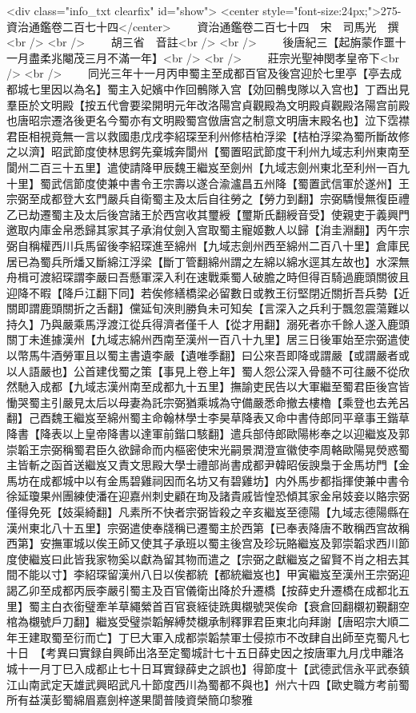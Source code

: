 <div class="info_txt clearfix" id="show">
<center style="font-size:24px;">275-資治通鑑卷二百七十四</center>
  　　資治通鑑卷二百七十四　宋　司馬光　撰<br />
<br />
　　胡三省　音註<br />
<br />
　　後唐紀三【起旃蒙作噩十一月盡柔兆閹茂三月不滿一年】<br />
<br />
　　莊宗光聖神閔孝皇帝下<br />
<br />
　　同光三年十一月丙申蜀主至成都百官及後宫迎於七里亭【亭去成都城七里因以為名】蜀主入妃嬪中作回鶻隊入宫【効回鶻曳隊以入宫也】丁酉出見羣臣於文明殿【按五代會要梁開明元年改洛陽宫貞觀殿為文明殿貞觀殿洛陽宫前殿也唐昭宗遷洛後更名今蜀亦有文明殿蜀宫倣唐宫之制意文明唐末殿名也】泣下霑襟君臣相視竟無一言以救國患戊戌李紹琛至利州修桔柏浮梁【桔柏浮梁為蜀所斷故修之以濟】昭武節度使林思鍔先棄城奔閬州【蜀置昭武節度干利州九域志利州東南至閬州二百三十五里】遣使請降甲辰魏王繼岌至劍州【九域志劍州東北至利州一百九十里】蜀武信節度使兼中書令王宗壽以遂合渝瀘昌五州降【蜀置武信軍於遂州】王宗弼至成都登大玄門嚴兵自衛蜀主及太后自往勞之【勞力到翻】宗弼驕慢無復臣禮乙已劫遷蜀主及太后後宫諸王於西宫收其璽綬【璽斯氏翻綬音受】使親吏于義興門邀取内庫金帛悉歸其家其子承㳙仗劍入宫取蜀主寵姬數人以歸【㳙圭淵翻】丙午宗弼自稱權西川兵馬留後李紹琛進至綿州【九域志劍州西至綿州二百八十里】倉庫民居已為蜀兵所燔又斷綿江浮梁【斷丁管翻綿州謂之左綿以綿水逕其左故也】水深無舟楫可渡紹琛謂李嚴曰吾懸軍深入利在速戰乘蜀人破膽之時但得百騎過鹿頭關彼且迎降不暇【降戶江翻下同】若俟修繕橋梁必留數日或教王衍堅閉近關折吾兵勢【近關即謂鹿頭關折之舌翻】儻延旬浹則勝負未可知矣【言深入之兵利于飄忽震蕩難以持久】乃與嚴乘馬浮渡江從兵得濟者僅千人【從才用翻】溺死者亦千餘人遂入鹿頭關丁未進據漢州【九域志綿州西南至漢州一百八十九里】居三日後軍始至宗弼遣使以幣馬牛酒勞軍且以蜀主書遺李嚴【遺唯季翻】曰公來吾即降或謂嚴【或謂嚴者或以人語嚴也】公首建伐蜀之策【事見上卷上年】蜀人怨公深入骨髓不可往嚴不從欣然馳入成都【九域志漢州南至成都九十五里】撫諭吏民告以大軍繼至蜀君臣後宫皆慟哭蜀主引嚴見太后以母妻為託宗弼猶乘城為守備嚴悉命撤去樓櫓【乘登也去羌呂翻】己酉魏王繼岌至綿州蜀主命翰林學士李昊草降表又命中書侍郎同平章事王鍇草降書【降表以上皇帝降書以達軍前鍇口駭翻】遣兵部侍郎歐陽彬奉之以迎繼岌及郭崇韜王宗弼稱蜀君臣久欲歸命而内樞密使宋光嗣景潤澄宣徽使李周輅歐陽晃熒惑蜀主皆斬之函首送繼岌又責文思殿大學士禮部尚書成都尹韓昭佞諛梟于金馬坊門【金馬坊在成都城中以有金馬碧雞祠因而名坊又有碧雞坊】内外馬步都指揮使兼中書令徐延瓊果州團練使潘在迎嘉州刺史顧在珣及諸貴戚皆惶恐傾其家金帛妓妾以賂宗弼僅得免死【妓渠綺翻】凡素所不快者宗弼皆殺之辛亥繼岌至德陽【九域志德陽縣在漢州東北八十五里】宗弼遣使奉牋稱已遷蜀主於西第【已奉表降唐不敢稱西宫故稱西第】安撫軍城以俟王師又使其子承班以蜀主後宫及珍玩賂繼岌及郭崇韜求西川節度使繼岌曰此皆我家物奚以獻為留其物而遣之【宗弼之獻繼岌之留賢不肖之相去其間不能以寸】李紹琛留漢州八日以俟都統【都統繼岌也】甲寅繼岌至漢州王宗弼迎謁乙卯至成都丙辰李嚴引蜀主及百官儀衛出降於升遷橋【按薛史升遷橋在成都北五里】蜀主白衣銜璧牽羊草繩縈首百官衰絰徒跣輿櫬號哭俟命【衰倉回翻櫬初覲翻空棺為櫬號戶刀翻】繼岌受璧崇韜解縛焚櫬承制釋罪君臣東北向拜謝【唐昭宗大順二年王建取蜀至衍而亡】丁巳大軍入成都崇韜禁軍士侵掠市不改肆自出師至克蜀凡七十日　【考異曰實録自興師出洛至定蜀城計七十五日薛史因之按唐軍九月戊申離洛城十一月丁巳入成都止七十日耳實録薛史之誤也】得節度十【武德武信永平武泰鎮江山南武定天雄武興昭武凡十節度西川為蜀都不與也】州六十四【歐史職方考前蜀所有益漢彭蜀綿眉嘉劍梓遂果閬普陵資榮簡卬黎雅